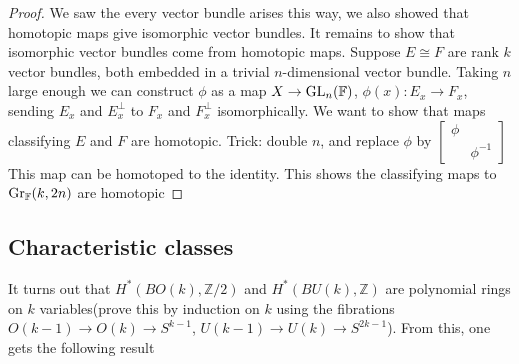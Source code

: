 \documentclass[main]{subfiles}
\begin{document}
\begin{proof}
We saw the every vector bundle arises this way, we also showed that homotopic maps give isomorphic vector bundles. It remains to show that isomorphic vector bundles come from homotopic maps. Suppose $E\cong F$ are rank $k$ vector bundles, both embedded in a trivial $n$-dimensional vector bundle. Taking $n$ large enough we can construct $\phi$ as a map $X\to\operatorname{GL}_n(\mathbb F)$, $\phi(x):E_x\to F_x$, sending $E_x$ and $E_x^\perp$ to $F_x$ and $F_x^\perp$ isomorphically. We want to show that maps classifying $E$ and $F$ are homotopic. Trick: double $n$, and replace $\phi$ by
$\begin{bmatrix}
\phi\\
&\phi^{-1}
\end{bmatrix}$
This map can be homotoped to the identity. This shows the classifying maps to $\operatorname{Gr}_{\mathbb F}(k,2n)$ are homotopic
\end{proof}

\subsection{Characteristic classes}

It turns out that $H^*(BO(k),\mathbb Z/2)$ and $H^*(BU(k),\mathbb Z)$ are polynomial rings on $k$ variables(prove this by induction on $k$ using the fibrations $O(k-1)\to O(k)\to S^{k-1}$, $U(k-1)\to U(k)\to S^{2k-1}$). From this, one gets the following result
\end{document}
